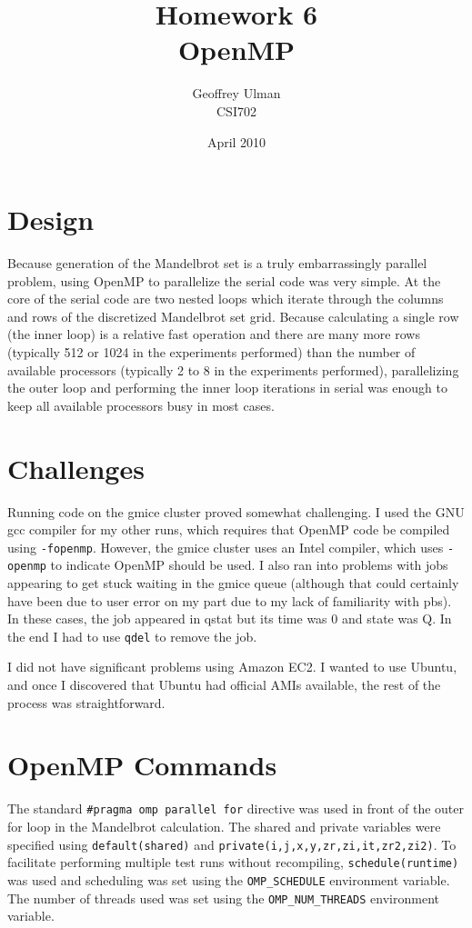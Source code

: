 \documentclass{article}
\begin{document}
\title{Homework 6\\
       OpenMP}
\author{Geoffrey Ulman\\
        CSI702}
\date{April 2010}
\maketitle

\section{Design}
Because generation of the Mandelbrot set is a truly embarrassingly parallel problem, using OpenMP to parallelize the serial code was very simple. At the core of the serial code are two nested loops which iterate through the columns and rows of the discretized Mandelbrot set grid. Because calculating a single row (the inner loop) is a relative fast operation and there are many more rows (typically 512 or 1024 in the experiments performed) than the number of available processors (typically 2 to 8 in the experiments performed), parallelizing the outer loop and performing the inner loop iterations in serial was enough to keep all available processors busy in most cases.

\section{Challenges}
Running code on the gmice cluster proved somewhat challenging. I used the GNU gcc compiler for my other runs, which requires that OpenMP code be compiled using \verb!-fopenmp!. However, the gmice cluster uses an Intel compiler, which uses \verb!-openmp! to indicate OpenMP should be used. I also ran into problems with jobs appearing to get stuck waiting in the gmice queue (although that could certainly have been due to user error on my part due to my lack of familiarity with pbs). In these cases, the job appeared in qstat but its time was 0 and state was Q. In the end I had to use \verb!qdel! to remove the job.

I did not have significant problems using Amazon EC2. I wanted to use Ubuntu, and once I discovered that Ubuntu had official AMIs available, the rest of the process was straightforward.

\section{OpenMP Commands}
The standard \verb!#pragma omp parallel for! directive was used in front of the outer for loop in the Mandelbrot calculation. The shared and private variables were specified using \verb!default(shared)! and \verb!private(i,j,x,y,zr,zi,it,zr2,zi2)!. To facilitate performing multiple test runs without recompiling, \verb!schedule(runtime)! was used and scheduling was set using the \verb!OMP_SCHEDULE! environment variable. The number of threads used was set using the \verb!OMP_NUM_THREADS! environment variable.
\end{document}
